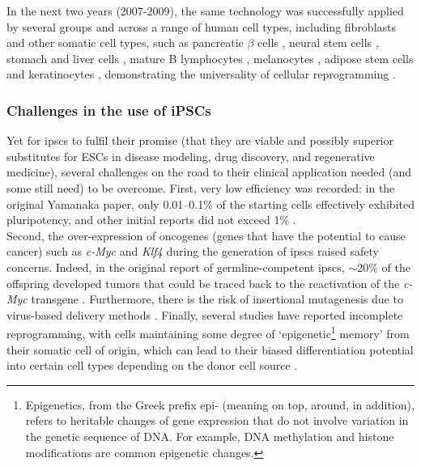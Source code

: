 In the next two years (2007-2009), the same technology was successfully applied by several groups and across a range of human cell types, including fibroblasts \cite{park2008reprogramming} and other somatic cell types, such as pancreatic $\beta$ cells \cite{stadtfeld2008reprogramming}, neural stem cells \cite{eminli2008reprogramming, kim2008pluripotent}, stomach and liver cells \cite{aoi2008generation}, mature B lymphocytes \cite{hanna2008direct}, melanocytes \cite{utikal2009sox2}, adipose stem cells \cite{sun2009feeder} and keratinocytes \cite{maherali2008high}, demonstrating the universality of cellular reprogramming \cite{omole2018ten}.

\subsubsection{Challenges in the use of iPSCs}
Yet for \glspl{ipsc} to fulfil their promise (that they are viable and possibly superior substitutes for ESCs in disease modeling, drug discovery, and regenerative medicine), several challenges on the road to their clinical application needed (and some still need) to be overcome.
First, very low efficiency was recorded: in the original Yamanaka paper, only 0.01–0.1\% \cite{takahashi2006induction} of the starting cells effectively exhibited pluripotency, and other initial reports did not exceed 1\% \cite{takahashi2007induction, okita2007generation, lowry2008generation}. \\

Second, the over-expression of oncogenes (genes that have the potential to cause cancer) such as \textit{c-Myc} and \textit{Klf4} during the generation of \glspl{ipsc} raised safety concerns.
Indeed, in the original report of germline-competent \glspl{ipsc}, $\sim$20\% of the offspring developed tumors that could be traced back to the reactivation of the \textit{c-Myc} transgene \cite{okita2007generation}. 
Furthermore, there is the risk of insertional mutagenesis due to virus-based delivery methods \cite{takahashi2006induction, takahashi2007induction, yu2007induced}. 
Finally, several studies have reported incomplete reprogramming, with cells maintaining some degree of `epigenetic\footnote{Epigenetics, from the Greek prefix epi- (meaning on top, around, in addition), refers to heritable changes of gene expression that do not involve variation in the genetic sequence of DNA.
For example, DNA methylation and histone modifications are common epigenetic changes.} memory' from their somatic cell of origin, which can lead to their biased differentiation potential into certain cell types depending on the donor cell source \cite{kim2010epigenetic, polo2010cell}.\\

